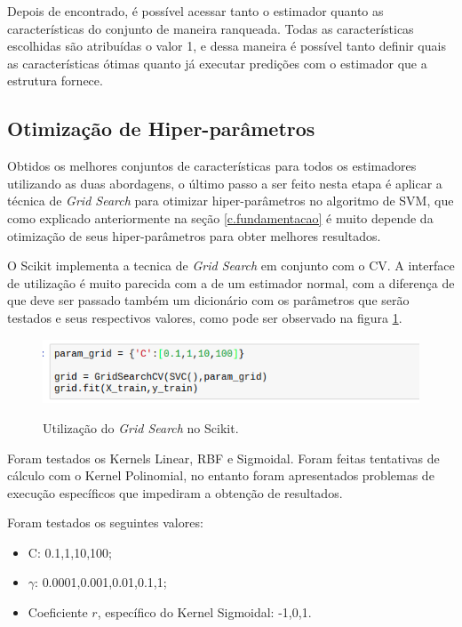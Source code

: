 Depois de encontrado, é possível acessar tanto o estimador quanto as características do conjunto de maneira ranqueada. Todas as características escolhidas são atribuídas o valor 1, e dessa maneira é possível tanto definir quais as características ótimas quanto já executar predições com o estimador que a estrutura fornece.  

\subsection{Otimização de Hiper-parâmetros}

Obtidos os melhores conjuntos de características para todos os estimadores utilizando as duas abordagens, o último passo a ser feito nesta etapa é aplicar a técnica de \textit{Grid Search} para otimizar hiper-parâmetros no algoritmo de SVM, que como explicado anteriormente na seção \ref{c.fundamentacao} é muito depende da otimização de seus hiper-parâmetros para obter melhores resultados.

O Scikit implementa a tecnica de \textit{Grid Search} em conjunto com o CV. A interface de utilização é muito parecida com a de um estimador normal, com a diferença de que deve ser passado também um dicionário com os parâmetros que serão testados e seus respectivos valores, como pode ser observado na figura \ref{f.exemplo-gridsearch}.

\begin{figure}[h]
\caption{\small Utilização do \textit{Grid Search} no Scikit.}
\centering
\includegraphics[scale=0.80]{figs/gridsearch.png}
\label{f.exemplo-gridsearch}
\end{figure}

Foram testados os Kernels Linear, RBF e Sigmoidal. Foram feitas tentativas de cálculo com o Kernel Polinomial, no entanto foram apresentados problemas de execução específicos que impediram a obtenção de resultados.

Foram testados os seguintes valores:

\begin{itemize}
    \item C: {0.1,1,10,100};
    \item $\gamma$: {0.0001,0.001,0.01,0.1,1};
    \item Coeficiente $r$, específico do Kernel Sigmoidal: {-1,0,1}.
\end{itemize}


